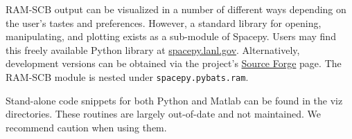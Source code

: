 RAM-SCB output can be visualized in a number of different ways depending on the user's tastes and preferences.  However, a standard library for opening, manipulating, and plotting exists as a sub-module of Spacepy.  Users may find this freely available Python library at \href{http://spacepy.lanl.gov/}{spacepy.lanl.gov}.  Alternatively, development versions can be obtained via the project's \href{http://sourceforge.net/projects/spacepy/}{Source Forge} page.  The RAM-SCB module is nested under {\tt spacepy.pybats.ram}.

Stand-alone code snippets for both Python and Matlab can be found in the {viz} directories.  These routines are largely out-of-date and not maintained. We recommend caution when using them.
